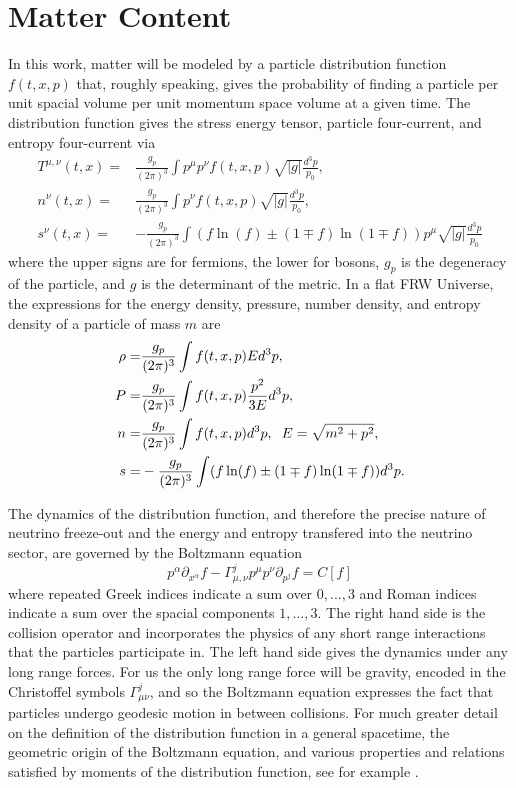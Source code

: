 \section{Matter Content}
In this work, matter will be modeled by a particle distribution function $f(t,x,p)$ that, roughly speaking, gives the probability of finding a particle per unit spacial volume per unit momentum space volume at a given time.  The distribution function gives the stress energy tensor, particle four-current, and entropy four-current via 
\begin{align}
T^{\mu,\nu}(t,x)=&\frac{g_p}{(2\pi)^3}\int p^\mu p^\nu f(t,x,p) \sqrt{|g|}\frac{d^3p}{p_0},\\
n^\nu(t,x)=&\frac{g_p}{(2\pi)^3}\int p^\nu f(t,x,p) \sqrt{|g|}\frac{d^3p}{p_0},\\
s^\nu(t,x)=&-\frac{g_p}{(2\pi)^3}\int(f\ln(f)\pm(1\mp f)\ln(1\mp f))p^\mu\sqrt{|g|}\frac{d^3p}{p_0}
\end{align}
where the upper signs are for fermions, the lower for bosons, $g_p$ is the degeneracy of the particle, and $g$ is the determinant of the metric.  In a flat FRW Universe, the expressions for the  energy density, pressure, number density, and entropy density of a particle of mass $m$ are
\begin{align}\label{moments}
\rho=&\frac{g_p}{(2\pi)^3}\int f(t,x,p)Ed^3p,\\
P=&\frac{g_p}{(2\pi)^3}\int f(t,x,p)\frac{p^2}{3E}d^3p,\\
n=&\frac{g_p}{(2\pi)^3}\int f(t,x,p) d^3p, \hspace{2mm} E=\sqrt{m^2+p^2},\\
s=&-\frac{g_p}{(2\pi)^3}\int (f\ln(f)\pm(1\mp f)\ln(1\mp f)) d^3p.
\end{align}

The dynamics of the distribution function,  and therefore the precise nature of neutrino freeze-out and the energy and entropy transfered into the neutrino sector, are governed by the Boltzmann equation
\begin{equation}
p^\alpha\partial_{x^\alpha} f-\Gamma^{j}_{\mu,\nu}p^\mu p^\nu\partial_{p^j}f=C[f]
\end{equation}
where repeated Greek indices indicate a sum over $0,...,3$ and Roman indices indicate a sum over the spacial components $1,...,3$.  The right hand side is the collision operator and incorporates the physics of any short range interactions that the particles participate in. The left hand side gives the dynamics under any long range forces. For us the only long range force will be gravity, encoded in the Christoffel symbols $\Gamma^j_{\mu\nu}$, and so the Boltzmann equation expresses the fact that particles undergo geodesic motion in between collisions. For much greater detail on the definition of the distribution function in a general spacetime, the geometric origin of the Boltzmann equation, and various properties and relations satisfied by moments of the distribution function, see for example \cite{andre,cercignani,bruhat,ehlers,kolb,bernstein2004kinetic}.

